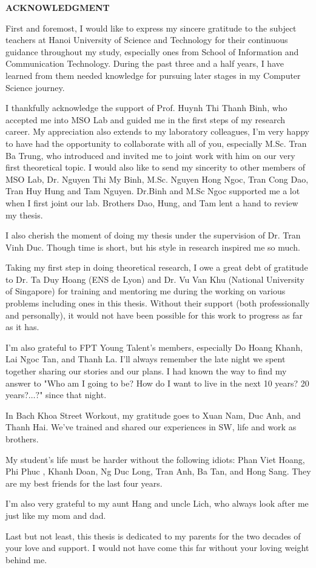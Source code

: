 
\begin{center}
    \Large{\textbf{ACKNOWLEDGMENT}}\\
\end{center}
\vspace{1cm}

First and foremost, I would like to express my sincere gratitude to the subject teachers at Hanoi University of Science and Technology for their continuous guidance throughout my study, especially ones from School of Information and Communication Technology. During the past three and a half years, I have learned from them needed knowledge for pursuing later stages in my Computer Science journey.

I thankfully acknowledge the support of Prof. Huynh Thi Thanh Binh, who accepted me into MSO Lab and guided me in the first steps of my research career. My appreciation also extends to my laboratory colleagues, I'm very happy to have had the opportunity to collaborate with all of you, especially M.Sc. Tran Ba Trung, who introduced and invited me to joint work with him on our very first theoretical topic. I would also like to send my sincerity to other members of MSO Lab, Dr. Nguyen Thi My Binh, M.Sc. Nguyen Hong Ngoc, Tran Cong Dao, Tran Huy Hung and Tam Nguyen. Dr.Binh and M.Sc Ngoc supported me a lot when I first joint our lab. Brothers Dao, Hung, and Tam lent a hand to review my thesis. 

I also cherish the moment of doing my thesis under the supervision of Dr. Tran Vinh Duc. Though time is short, but his style in research inspired me so much. 

Taking my first step in doing theoretical research, I owe a great debt of gratitude to Dr. Ta Duy Hoang (ENS de Lyon) and Dr. Vu Van Khu (National University of Singapore) for training and mentoring me during the working on various problems including ones in this thesis. Without their support (both professionally and personally), it would not have been possible for this work to progress as far as it has. 

I'm also grateful to FPT Young Talent's members, especially Do Hoang Khanh, Lai Ngoc Tan, and Thanh La. I'll always remember the late night we spent together sharing our stories and our plans. I had known the way to find my answer to "Who am I going to be? How do I want to live in the next 10 years? 20 years?$\ldots?$" since that night.

In Bach Khoa Street Workout, my gratitude goes to Xuan Nam, Duc Anh, and Thanh Hai. We've trained and shared our experiences in SW, life and  work as brothers. 

My student's life must be harder without the following idiots: Phan Viet Hoang, Phi Phuc , Khanh Doan, Ng Duc Long, Tran Anh, Ba Tan, and Hong Sang. They are my best friends for the last four years.

I'm also very grateful to my aunt Hang and uncle Lich, who always look after me just like my mom and dad. 

Last but not least, this thesis is dedicated to my parents for the two decades of your love and support. I would not have come this far without your loving weight behind me.
